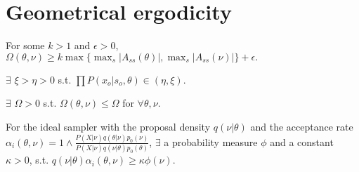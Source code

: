 \section{Geometrical ergodicity}
\begin{assumption}
For some $k > 1$ and $\epsilon > 0$, $\Omega(\theta, \nu) \geq k \max \{ \max_s|A_{ss}(\theta)|, \max_s|A_{ss}(\nu)| \} + \epsilon.$ 
\end{assumption}

\begin{assumption}
$\exists$ $ \xi > \eta > 0$ s.t. $\prod P(x_o | s_o, \theta) \in (\eta, \xi)$.
\end{assumption}

\begin{assumption}
$\exists$ $\Omega > 0$ s.t. $\Omega(\theta, \nu)  \leq \Omega$ for $\forall \theta, \nu$.
\end{assumption}

\begin{assumption}
For the ideal sampler with the proposal density $q(\nu| \theta)$ and the acceptance rate $\alpha_i(\theta, \nu) = 1 \wedge \frac{P(X | \nu)q(\theta| \nu)p_0(\nu)}{P(X | \nu)q(\nu| \theta)p_0(\theta)}$, $\exists$ a probability measure $\phi$ and a constant $\kappa > 0$, s.t. $q(\nu | \theta) \alpha_i(\theta, \nu) \geq \kappa \phi(\nu)$. 
\end{assumption}

